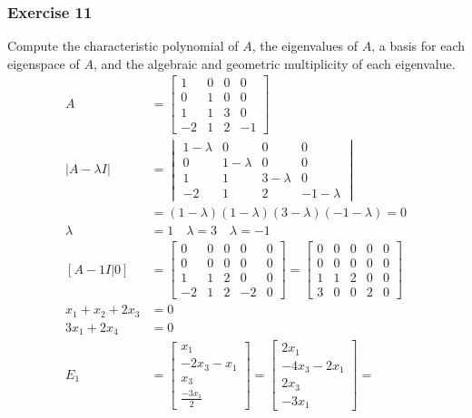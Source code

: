 \documentclass{math}
\begin{document}
\subsubsection*{Exercise 11}
Compute the characteristic polynomial of \( A \), the eigenvalues of \( A \),
a basis for each eigenspace of \( A \), and the algebraic and geometric
multiplicity of each eigenvalue.
\begin{align*}
  A &= \begin{bmatrix}
    1 & 0 & 0 & 0 \\
    0 & 1 & 0 & 0 \\
    1 & 1 & 3 & 0 \\
    -2 & 1 & 2 & -1
  \end{bmatrix} \\
  |A-\lambda I| &= \begin{vmatrix}
    1-\lambda & 0 & 0 & 0 \\
    0 & 1-\lambda & 0 & 0 \\
    1 & 1 & 3-\lambda & 0 \\
    -2 & 1 & 2 & -1-\lambda
  \end{vmatrix} \\
  &= (1-\lambda)(1-\lambda)(3-\lambda)(-1-\lambda) = 0 \\
  \lambda &= 1 \quad \lambda = 3 \quad \lambda = -1 \\
  [A-1I|0] &= \begin{bmatrix}
    0 & 0 & 0 & 0 & 0 \\
    0 & 0 & 0 & 0 & 0 \\
    1 & 1 & 2 & 0 & 0 \\
    -2 & 1 & 2 & -2 & 0
  \end{bmatrix} = \begin{bmatrix}
    0 & 0 & 0 & 0 & 0 \\
    0 & 0 & 0 & 0 & 0 \\
    1 & 1 & 2 & 0 & 0 \\
    3 & 0 & 0 & 2 & 0
  \end{bmatrix} \\
  x_1+x_2+2x_3 &= 0 \\
  3x_1+2x_4 &= 0 \\
  E_1 &= \begin{bmatrix}
    x_1 \\ -2x_3-x_1 \\ x_3 \\ \frac{-3x_1}{2}
  \end{bmatrix} =
    \begin{bmatrix}2x_1 \\ -4x_3-2x_1 \\ 2x_3 \\ -3x_1\end{bmatrix} =

\end{align*}
\end{document}
